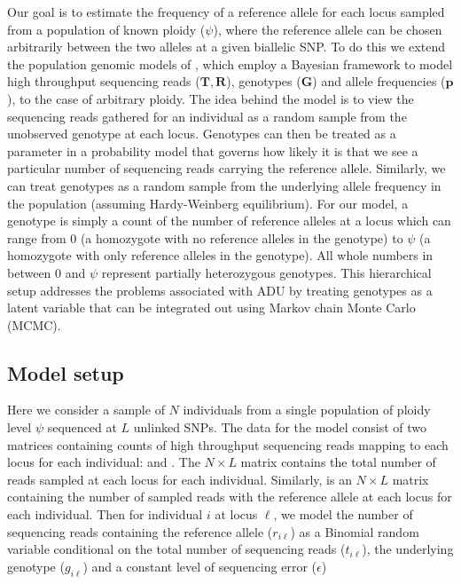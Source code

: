 \documentclass[11pt,english,letterpaper,oneside]{article}
\begin{document}
\noindent Our goal is to estimate the frequency of a reference allele for each locus sampled from a population of known ploidy ($\psi$), where the reference allele can be chosen arbitrarily between the two alleles at a given biallelic SNP. To do this we extend the population genomic models of \cite{buerkle2013popModels}, which employ a Bayesian framework to model high throughput sequencing reads ($\bm{T},\bm{R}$), genotypes ($\bm{G}$) and allele frequencies ($\bm{p}$), to the case of arbitrary ploidy. The idea behind the model is to view the sequencing reads gathered for an individual as a random sample from the unobserved genotype at each locus. Genotypes can then be treated as a parameter in a probability model that governs how likely it is that we see a particular number of sequencing reads carrying the reference allele. Similarly, we can treat genotypes as a random sample from the underlying allele frequency in the population (assuming Hardy-Weinberg equilibrium). For our model, a genotype is simply a count of the number of reference alleles at a locus which can range from 0 (a homozygote with no reference alleles in the genotype) to $\psi$ (a homozygote with only reference alleles in the genotype). All whole numbers in between 0 and $\psi$ represent partially heterozygous genotypes. This hierarchical setup addresses the problems associated with ADU by treating genotypes as a latent variable that can be integrated out using Markov chain Monte Carlo (MCMC).

\medskip
\subsection*{Model setup}
\medskip

Here we consider a sample of $N$ individuals from a single population of ploidy level $\psi$ sequenced at $L$ unlinked SNPs. The data for the model consist of two matrices containing counts of high throughput sequencing reads mapping to each locus for each individual: \rmat{} and \tmat. The $N \times L$ matrix \tmat{} contains the total number of reads sampled at each locus for each individual. Similarly, \rmat{} is an $N \times L$ matrix containing the number of sampled reads with the reference allele at each locus for each individual. Then for individual $i$ at locus $\ell$, we model the number of sequencing reads containing the reference allele ($r_{i\ell}$) as a Binomial random variable conditional on the total number of sequencing reads ($t_{i\ell} $), the underlying genotype ($g_{i\ell}$) and a constant level of sequencing error ($\epsilon$)
\end{document}
